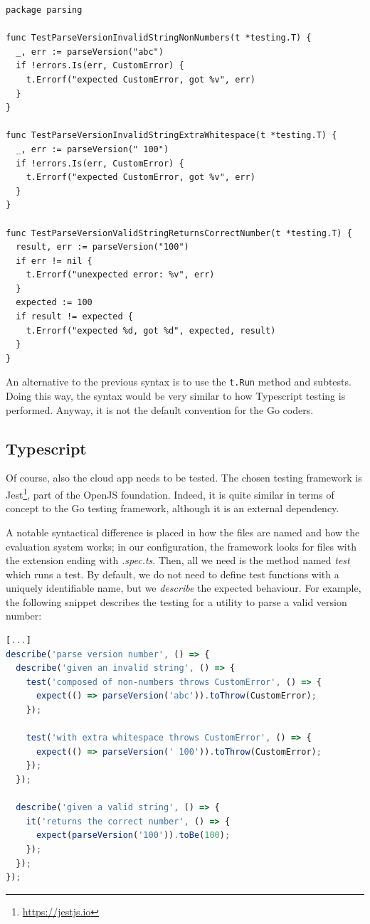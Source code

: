 \begin{lstlisting}[language=Golang, caption={Go testing framework example file parsing\_test.go}]
package parsing

func TestParseVersionInvalidStringNonNumbers(t *testing.T) {
  _, err := parseVersion("abc")
  if !errors.Is(err, CustomError) {
    t.Errorf("expected CustomError, got %v", err)
  }
}

func TestParseVersionInvalidStringExtraWhitespace(t *testing.T) {
  _, err := parseVersion(" 100")
  if !errors.Is(err, CustomError) {
    t.Errorf("expected CustomError, got %v", err)
  }
}

func TestParseVersionValidStringReturnsCorrectNumber(t *testing.T) {
  result, err := parseVersion("100")
  if err != nil {
    t.Errorf("unexpected error: %v", err)
  }
  expected := 100
  if result != expected {
    t.Errorf("expected %d, got %d", expected, result)
  }
}
\end{lstlisting}

An alternative to the previous syntax is to use the \texttt{t.Run} method and subtests. Doing this way, the syntax would be very similar to how Typescript testing is performed. Anyway, it is not the default convention for the Go coders.

\subsection{Typescript}

Of course, also the cloud app needs to be tested. The chosen testing framework is Jest\footnote{\url{https://jestjs.io}}, part of the OpenJS foundation. Indeed, it is quite similar in terms of concept to the Go testing framework, although it is an external dependency.

A notable syntactical difference is placed in how the files are named and how the evaluation system works; in our configuration, the framework looks for files with the extension ending with \textit{.spec.ts}. Then, all we need is the method named \textit{test} which runs a test. By default, we do not need to define test functions with a uniquely identifiable name, but we \textit{describe} the expected behaviour. For example, the following snippet describes the testing for a utility to parse a valid version number:

\begin{lstlisting}[language=Javascript, caption={Jest testing framework example file parsing.spec.ts}]
[...]
describe('parse version number', () => {
  describe('given an invalid string', () => {
    test('composed of non-numbers throws CustomError', () => {
      expect(() => parseVersion('abc')).toThrow(CustomError);
    });

    test('with extra whitespace throws CustomError', () => {
      expect(() => parseVersion(' 100')).toThrow(CustomError);
    });
  });

  describe('given a valid string', () => {
    it('returns the correct number', () => {
      expect(parseVersion('100')).toBe(100);
    });
  });
});
\end{lstlisting}

